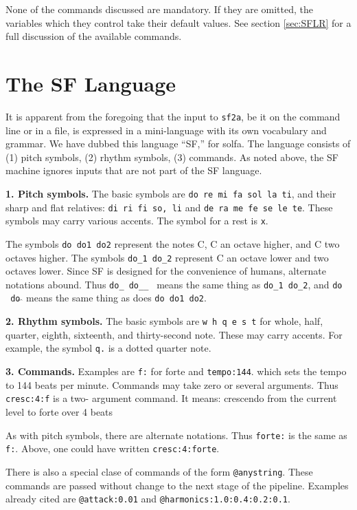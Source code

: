 \documentclass[11pt]{amsart}
\newcommand{\mcaret}{$\hat{}$}
\newcommand{\mmcaret}{$\hat{}\;\hat{}$}
\newcommand{\strong}[1]{{\bf #1}}
\begin{document}
None of the commands discussed are mandatory.  If they are omitted, the variables which they
control take their default values.  See section \ref{sec:SFLR} for a full discussion of the
available commands.

\section{The SF Language}

It is apparent from the foregoing that the input to {\tt sf2a}, be it 
on the command line or in a file, is  expressed in a mini-language with its
own vocabulary and grammar.  We have dubbed this language ``SF,'' for solfa.
The language consists of (1) pitch symbols, (2) rhythm symbols, (3) commands.
As noted above, the SF machine ignores inputs that are not part of the SF language.


\strong{1. Pitch symbols.}  The basic symbols are {\tt do re mi fa sol la ti}, and their
sharp and flat relatives: {\tt di ri fi so, li} and {\tt de ra me fe se le te}.
These symbols may carry various accents.  The symbol for a rest is {\tt x}.

The symbols {\tt do do1 do2} represent the 
notes C, C an octave higher, and C two octaves higher.  The symbols {\tt do\_1 do\_2}
represent C an octave lower and two octaves lower.  Since SF is designed for the 
convenience of humans, alternate notations abound.  Thus {\tt do\_ do\_\_ } means
the same thing as {\tt do\_1 do\_2}, and {\tt do\mcaret\ do{\mmcaret}} means the same thing
as does {\tt do do1 do2}.

\strong{2. Rhythm symbols.}  The basic symbols are {\tt w h q e s t} for whole, half, quarter, eighth,
sixteenth, and thirty-second note.  These may carry accents.  For example, the symbol {\tt q.} is a dotted 
quarter note.

\strong{3. Commands.} Examples are {\tt f:} for forte and {\tt tempo:144}. 
which sets the tempo to 144
beats per minute.  Commands may take zero or several arguments.  Thus {\tt cresc:4:f} is a two-
argument
command.  It means: crescendo from the current level to forte over 4 beats

As with pitch symbols, there are alternate notations.  Thus {\tt forte:} is the same as 
{\tt f:}. Above, one could have written {\tt cresc:4:forte}. 

There is also a special clase of commands of the form {\tt @anystring}.  These commands are passed without
change to the next stage of the pipeline.  Examples already cited are {\tt @attack:0.01} and 
{\tt @harmonics:1.0:0.4:0.2:0.1}.
\end{document}
